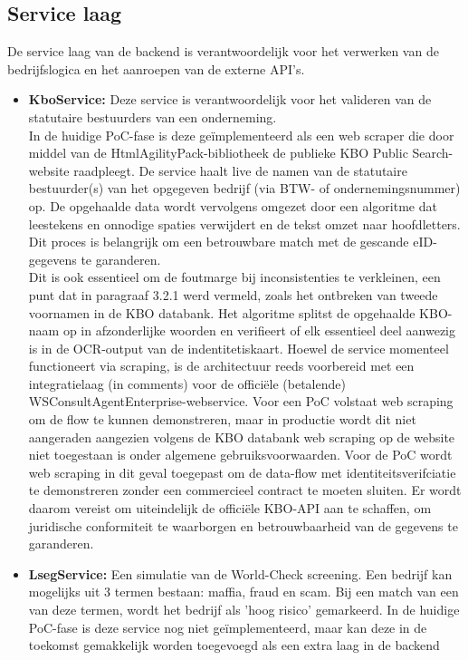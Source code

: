 \subsection{Service laag}
De service laag van de backend is verantwoordelijk voor het verwerken van de bedrijfslogica en het aanroepen van de externe API's.

\begin{itemize}
    \item \textbf{KboService:} Deze service is verantwoordelijk voor het valideren van de statutaire bestuurders van een onderneming. \\ In de huidige PoC-fase is deze geïmplementeerd als een web scraper die door middel van de HtmlAgilityPack-bibliotheek de publieke KBO Public Search-website raadpleegt. 
    De service haalt live de namen van de statutaire bestuurder(s) van het opgegeven bedrijf (via BTW- of ondernemingsnummer) op.
    De opgehaalde data wordt vervolgens omgezet door een algoritme dat leestekens en onnodige spaties verwijdert en de tekst omzet naar hoofdletters. Dit proces is belangrijk om een betrouwbare match met de gescande eID-gegevens te garanderen.
    \\ Dit is ook essentieel om de foutmarge bij inconsistenties te verkleinen, een punt dat in paragraaf 3.2.1 werd vermeld, zoals het ontbreken van tweede voornamen in de KBO databank.
    Het algoritme splitst de opgehaalde KBO-naam op in afzonderlijke woorden en verifieert of elk essentieel deel aanwezig is in de OCR-output van de indentitetiskaart.
    Hoewel de service momenteel functioneert via scraping, is de architectuur reeds voorbereid met een integratielaag (in comments) voor de officiële (betalende) WSConsultAgentEnterprise-webservice. Voor een PoC volstaat web scraping om de flow te kunnen demonstreren,
    maar in productie wordt dit niet aangeraden aangezien volgens de KBO databank web scraping op de website niet toegestaan is onder algemene gebruiksvoorwaarden. Voor de PoC wordt web scraping in dit geval toegepast om de data-flow met identiteitsverifciatie te demonstreren zonder
    een commercieel contract te moeten sluiten. Er wordt daarom vereist om uiteindelijk de officiële KBO-API aan te schaffen, om juridische conformiteit te waarborgen en betrouwbaarheid van de gegevens te garanderen.
    \item \textbf{LsegService:} Een simulatie van de World-Check screening. Een bedrijf kan mogelijks uit 3 termen bestaan: maffia, fraud en scam. Bij een match van een van deze termen, wordt het bedrijf als 'hoog risico' gemarkeerd. In de huidige PoC-fase is deze service nog niet geïmplementeerd, maar kan deze in de toekomst gemakkelijk worden toegevoegd als een extra laag in de backend

\end{itemize}
